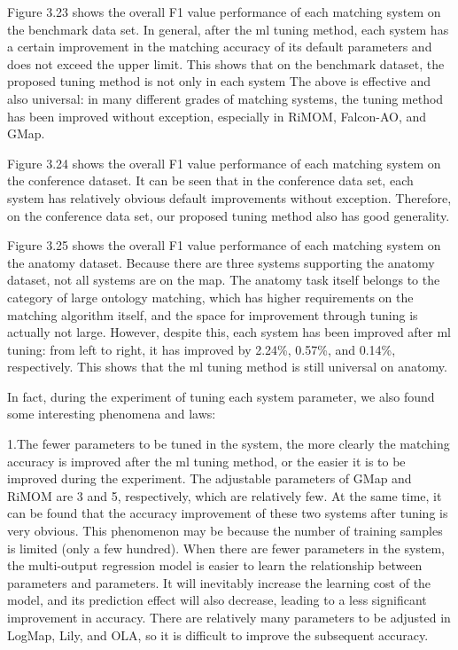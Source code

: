 \documentclass[twoside]{article}
\begin{document}
Figure 3.23 shows the overall F1 value performance of each matching system on the benchmark data set.
In general, after the ml tuning method, each system has a certain improvement in the matching accuracy of its default parameters and does not exceed the upper limit. This shows that on the benchmark dataset, the proposed tuning method is not only in each system The above is effective and also universal: in many different grades of matching systems, the tuning method has been improved without exception, especially in RiMOM, Falcon-AO, and GMap.

Figure 3.24 shows the overall F1 value performance of each matching system on the conference dataset.
It can be seen that in the conference data set, each system has relatively obvious default improvements without exception. Therefore, on the conference data set, our proposed tuning method also has good generality.

Figure 3.25 shows the overall F1 value performance of each matching system on the anatomy dataset.
Because there are three systems supporting the anatomy dataset, not all systems are on the map.
The anatomy task itself belongs to the category of large ontology matching, which has higher requirements on the matching algorithm itself, and the space for improvement through tuning is actually not large.
However, despite this, each system has been improved after ml tuning: from left to right, it has improved by 2.24\%, 0.57\%, and 0.14\%, respectively. This shows that the ml tuning method is still universal on anatomy.

In fact, during the experiment of tuning each system parameter, we also found some interesting phenomena and laws:

1.The fewer parameters to be tuned in the system, the more clearly the matching accuracy is improved after the ml tuning method, or the easier it is to be improved during the experiment.
The adjustable parameters of GMap and RiMOM are 3 and 5, respectively, which are relatively few. At the same time, it can be found that the accuracy improvement of these two systems after tuning is very obvious.
This phenomenon may be because the number of training samples is limited (only a few hundred). When there are fewer parameters in the system, the multi-output regression model is easier to learn the relationship between parameters and parameters. It will inevitably increase the learning cost of the model, and its prediction effect will also decrease, leading to a less significant improvement in accuracy. There are relatively many parameters to be adjusted in LogMap, Lily, and OLA, so it is difficult to improve the subsequent accuracy.
\end{document}
